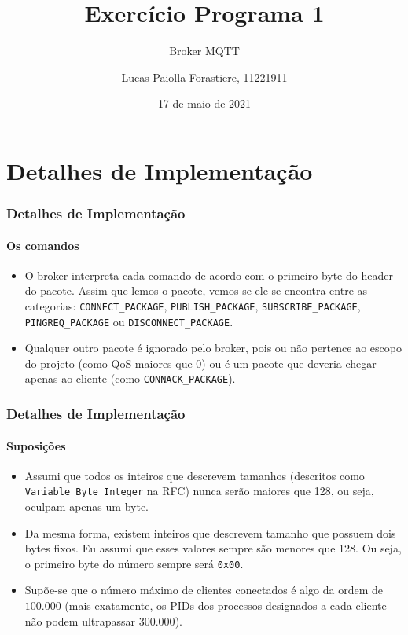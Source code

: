 \documentclass[10pt]{beamer}
\title{Exercício Programa 1}
\subtitle{Broker MQTT}
\institute{IME-USP}
\author{Lucas Paiolla Forastiere, 11221911}
\date{17 de maio de 2021}
\begin{document}
    \maketitle

    \section{Detalhes de Implementação}

    \begin{frame}[t]
      \frametitle{Detalhes de Implementação}
      \framesubtitle{Os comandos}
      \begin{itemize}
        \item O broker interpreta cada comando de acordo com o primeiro byte do
          header do pacote. Assim que lemos o pacote, vemos se ele se encontra
          entre as categorias: \texttt{CONNECT\_PACKAGE},
          \texttt{PUBLISH\_PACKAGE}, \texttt{SUBSCRIBE\_PACKAGE},
          \texttt{PINGREQ\_PACKAGE} ou \texttt{DISCONNECT\_PACKAGE}.
        \item Qualquer outro pacote é ignorado pelo broker, pois ou não pertence
          ao escopo do projeto (como QoS maiores que $0$) ou é um pacote que
          deveria chegar apenas ao cliente (como \texttt{CONNACK\_PACKAGE}).
      \end{itemize}
    \end{frame}

    \begin{frame}[t]
      \frametitle{Detalhes de Implementação}
      \framesubtitle{Suposições}
      \begin{itemize}
        \item Assumi que todos os inteiros que descrevem tamanhos (descritos
          como \texttt{Variable Byte Integer} na RFC) nunca serão maiores que
          128, ou seja, oculpam apenas um byte.
        \item Da mesma forma, existem inteiros que descrevem tamanho que possuem
          dois bytes fixos. Eu assumi que esses valores sempre são menores que
          128. Ou seja, o primeiro byte do número sempre será \texttt{0x00}.
        \item Supõe-se que o número máximo de clientes conectados é algo da
          ordem de $100.000$ (mais exatamente, os PIDs dos processos designados
          a cada cliente não podem ultrapassar $300.000$).
      \end{itemize}
    \end{frame}
\end{document}
